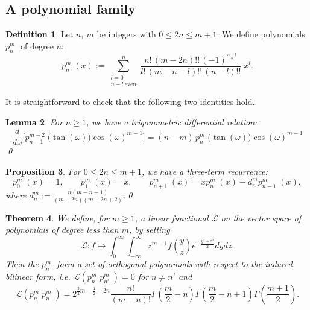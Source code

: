 \documentclass{amsart}
\newcommand{\ie}{{\it i.e. }}
\newcommand{\p}[2]{p_{#1}^{#2}\;\!\!}
\renewcommand{\L}{\mathcal{L}}
\newcommand{\coloneqq}{:=}
\theoremstyle{plain}
\newtheorem{theorem}{Theorem}[section]
\newtheorem{lemma}[theorem]{Lemma}
\newtheorem{proposition}[theorem]{Proposition}
\theoremstyle{definition}
\newtheorem{definition}[theorem]{Definition}
\theoremstyle{remark}
\begin{document}
\subsection{A polynomial family}
\begin{definition} Let $n,\ m$ be integers with $0\leq 2n\leq m+1$. We define polynomials $\p{n}{m}$ of degree $n$:
\begin{equation}
\p{n}{m}(x) \coloneqq \sum_{\substack{l=0\\ n-l\ \text{even}}}^n \frac{n!\,(m-2n)!!\,(-1)^{\frac{n-l}{2}}}{l!\,(m-n-l)!!\,(n-l)!!}\;x^l.
\end{equation}
\end{definition}
It is straightforward to check that the following two identities hold.
\begin{lemma} \label{trigonometric}
For $n\geq 1$, we have a trigonometric differential relation:
\begin{equation}
\frac{d}{d\omega} \Big[\p{n-1}{m-2}\big(\tan(\omega)\big)\cos(\omega)^{m-1} \Big]= (n-m)\, \p{n}{m}\big(\tan(\omega)\big)\cos(\omega)^{m-1}
\end{equation} \qed
\end{lemma}
\begin{proposition} \label{threeterm} For $0\leq 2n\leq m+1$, we have a three-term recurrence:
\begin{equation}
\p{0}{m}(x) = 1,\qquad \p{1}{m}(x) = x, \qquad \p{n+1}{m}(x) = x\p{n}{m}(x) -d_n^m \p{n-1}{m}(x),
\end{equation} 
where $d_n^m\coloneqq \frac{n(m-n+1)}{(m-2n)(m-2n+2)}$.\qed
\end{proposition}
\begin{theorem} \label{pthm}We define, for $m\geq 1$, a linear functional $\L$ on the vector space of polynomials of degree less than $m$, by setting
\begin{equation}
\L: f \longmapsto \int_0^\infty\!\!\! \int_{-\infty}^\infty z^{m-1}f\left(\frac{y}{z}\right) e^{-\frac{y^2+z^2}{2}} dydz.
\end{equation}
Then the $\p{n}{m}$ form a set of orthogonal polynomials with respect to the induced bilinear form, \ie $\L(\p{n}{m}\p{n'}{m})=0$ for $n\neq n'$ and 
\begin{equation} \label{Lpn2}
\L(\p{n}{m}\p{n}{m}) = 2^{\frac{3}{2}m-\frac{1}{2}-2n}  \frac{n!}{(m-n)!}
\Gamma\left(\frac{m}{2}-n\right)\Gamma\left(\frac{m}{2}-n+1\right)\Gamma\left(\frac{m+1}{2}\right).
\end{equation}
\end{theorem}
\end{document}
